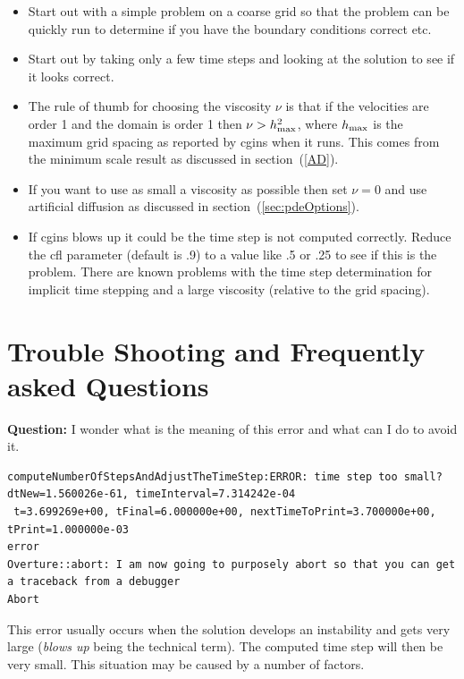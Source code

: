 \documentclass{article}
\newcommand{\Index}[1]{#1\index{#1}}
\begin{document}
\begin{itemize}
  \item Start out with a simple problem on a coarse grid so that the problem
      can be quickly run to determine if you have the boundary conditions correct etc.
  \item Start out by taking only a few time steps and looking at the solution to
      see if it looks correct.
  \item The rule of thumb for choosing the viscosity $\nu$ is that if the velocities
    are order 1 and the domain is order 1 then $\nu > h_{\rm max}^2$, where 
    $h_{\rm max}$ is the maximum grid spacing as reported by cgins when it runs.
    This comes from the minimum scale result as discussed in section~(\ref{AD}).
  \item If you want to use as small a viscosity as possible then set $\nu=0$
    and use \Index{artificial diffusion} as discussed in section~(\ref{sec:pdeOptions}).
  \item If cgins blows up it could be the time step is not computed correctly. Reduce
   the cfl parameter (default is .9) to a value like .5 or .25 to see if this is the problem.
   There are known problems with the time step determination for implicit time stepping and
   a large viscosity (relative to the grid spacing).
\end{itemize}

\section{Trouble Shooting and Frequently asked Questions}

{\bf Question:} I wonder what is the meaning of this error and what can I do to avoid it.
\begin{verbatim}
computeNumberOfStepsAndAdjustTheTimeStep:ERROR: time step too small? dtNew=1.560026e-61, timeInterval=7.314242e-04
 t=3.699269e+00, tFinal=6.000000e+00, nextTimeToPrint=3.700000e+00, tPrint=1.000000e-03
error
Overture::abort: I am now going to purposely abort so that you can get a traceback from a debugger
Abort
\end{verbatim}

This error usually occurs when the solution develops an instability and gets very
large ({\em blows up} being the technical term). The computed time step will
then be very small. This situation may be caused by a number of factors.
\end{document}
